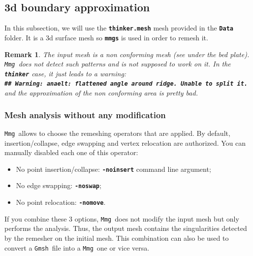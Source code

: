 \documentclass{article}
\newtheorem{remark}{Remark}[section]
\newcommand{\ttb}[1]{\texttt{\textbf{#1}}}
\newcommand{\mmg}{\texttt{Mmg}}
\newcommand{\gmsh}{\texttt{Gmsh}}
\begin{document}
\subsection{3d boundary approximation}
In this subsection, we will use the \ttb{thinker.mesh} mesh provided
in the \ttb{Data} folder. It is a 3d surface mesh so
\ttb{mmgs} is used in order to remesh it.

\begin{remark}
The input mesh is a non conforming mesh (see under the
bed plate). \mmg\ does not detect such patterns and is not supposed to work on it.
In the \ttb{thinker} case, it just leads to a warning:\\
\ttb{\#\# Warning: anaelt: flattened angle around ridge. Unable to split it.\\}
 and the approximation of the non conforming area is pretty bad.
 \end{remark}

\subsubsection{Mesh analysis without any modification}
\mmg\ allows to choose the remeshing operators that are applied. By
default, insertion/collapse, edge swapping and vertex relocation are
authorized. You can manually disabled each one of this operator:
\begin{itemize}
\item No point insertion/collapse: \ttb{-noinsert} command line argument;
\item No edge swapping: \ttb{-noswap};
\item No point relocation: \ttb{-nomove}.
\end{itemize}

If you combine these 3 options, \mmg\ does not modify the input mesh but only
performs the analysis. Thus, the output mesh contains the singularities
detected by the remesher on the initial mesh. This combination can
also be used to convert a \gmsh\ file into a \mmg\ one or vice versa.
\end{document}
